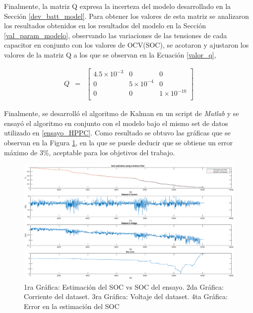 \documentclass[10pt, a4paper]{article}
\begin{document}
Finalmente, la matriz Q expresa la incerteza del modelo desarrollado en la 
Secci\'on \ref{dev_batt_model}. Para obtener los valores de esta matriz se
analizaron los resultados obtenidos en los resultados del modelo en la Secci\'on 
\ref{val_param_modelo}, observando las variaciones de las tensiones de cada
capacitor en conjunto con los valores de \acrshort{OCV}(SOC), se acotaron y
ajustaron los valores de la matriz Q a los que se observan en la Ecuaci\'on
\ref{valor_q},

\begin{equation}
    \begin{array}{llll}
	Q & = & \begin{bmatrix}
	    4.5\times10^{-3} & 0 & 0 \\
	    0 & 5\times10^{-4} & 0 \\
	    0 & 0 & 1\times10^{-10} \\
	\end{bmatrix} 
    \end{array} \nonumber
\end{equation}

Finalmente, se desarroll\'o el algoritmo de Kalman en un script de \emph{Matlab}
y se ensay\'o el algoritmo en conjunto con el modelo bajo el mismo set de datos
utilizado en \ref{ensayo_HPPC}. Como resultado se obtuvo las gr\'aficas que se
observan en la Figura \ref{kalman_result_matlab}, en la que se puede deducir que
se obtiene un error m\'aximo de 3\%, aceptable para los objetivos del trabajo.

\begin{figure}[h!]
    \begin{center}
        \includegraphics[width=1\textwidth]{kalman_result_matlab.eps}
        \caption{1ra Gr\'afica: Estimaci\'on del \acrshort{SOC} vs
        \acrshort{SOC} del ensayo. 2da Gr\'afica: Corriente del dataset. 3ra
        Gr\'afica: Voltaje del dataset. 4ta Gr\'afica: Error en la estimaci\'on
        del \acrshort{SOC}} 
        \label{kalman_result_matlab}
    \end{center}
\end{figure}
\end{document}
